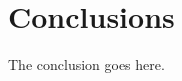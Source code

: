 \documentclass[journal]{IEEEtran}
\begin{document}
\section{Conclusions}
The conclusion goes here.






%


%
%
%
%
%
%
%
\end{document}
